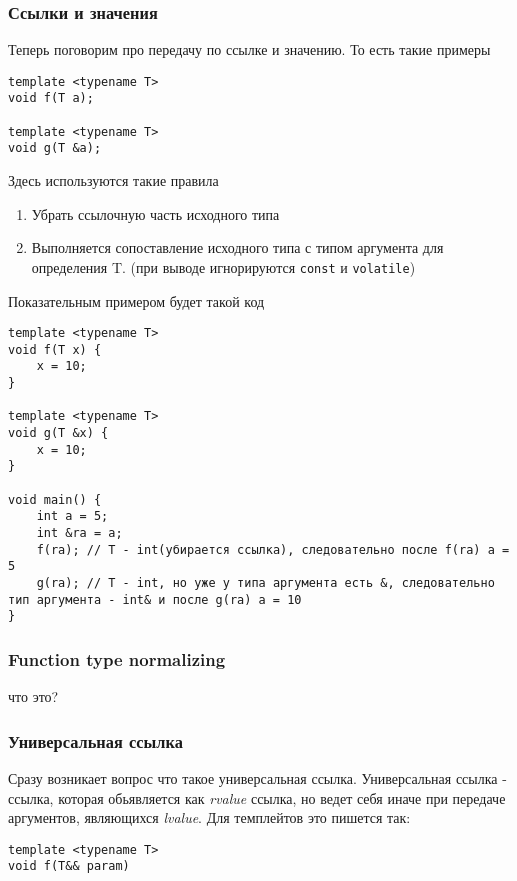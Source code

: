 		\subsubsection{Ссылки и значения}
			Теперь поговорим про передачу по ссылке и значению. То есть такие примеры
\begin{verbatim}
template <typename T>
void f(T a);

template <typename T>
void g(T &a);
\end{verbatim}
			
			Здесь используются такие правила
			\begin{enumerate}
				\item Убрать ссылочную часть исходного типа
				\item Выполняется сопоставление исходного типа с типом аргумента для определения T. (при выводе игнорируются \texttt{const} и \texttt{volatile})
			\end{enumerate}
			Показательным примером будет такой код
\begin{verbatim}
template <typename T>
void f(T x) {
	x = 10;
}

template <typename T>
void g(T &x) {
	x = 10;
}

void main() {
	int a = 5;
	int &ra = a;
	f(ra); // T - int(убирается ссылка), следовательно после f(ra) a = 5
	g(ra); // T - int, но уже у типа аргумента есть &, следовательно тип аргумента - int& и после g(ra) a = 10
}
\end{verbatim}
		
		\subsubsection{Function type normalizing} что это?
		
		\subsubsection{Универсальная ссылка}
			Сразу возникает вопрос что такое универсальная ссылка. Универсальная ссылка - ссылка, которая обьявляется как \textit{rvalue} ссылка, но ведет себя иначе при передаче аргументов, являющихся \textit{lvalue}.
			Для темплейтов это пишется так:
\begin{verbatim}
template <typename T>
void f(T&& param)
\end{verbatim}
			
